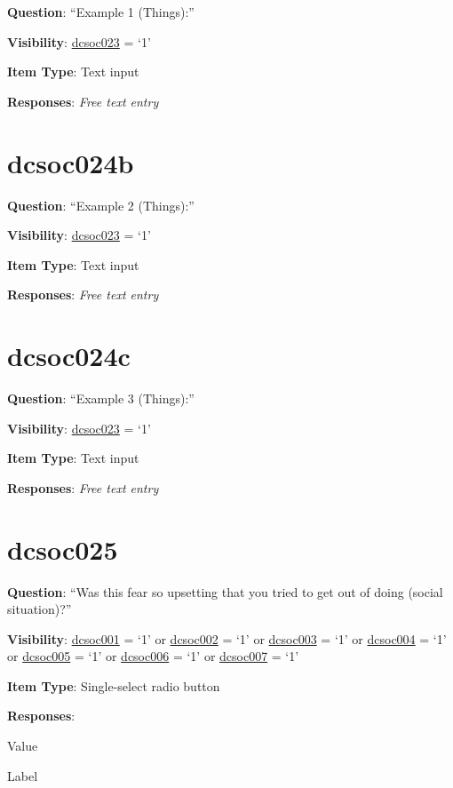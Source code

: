 \documentclass[]{book}
\begin{document}
\textbf{Question}: ``Example 1 (Things):''

\textbf{Visibility}: \protect\hyperlink{dcsoc023}{dcsoc023} = `1'

\textbf{Item Type}: Text input

\textbf{Responses}: \emph{Free text entry}

\hypertarget{dcsoc024b}{%
\section{dcsoc024b}\label{dcsoc024b}}

\textbf{Question}: ``Example 2 (Things):''

\textbf{Visibility}: \protect\hyperlink{dcsoc023}{dcsoc023} = `1'

\textbf{Item Type}: Text input

\textbf{Responses}: \emph{Free text entry}

\hypertarget{dcsoc024c}{%
\section{dcsoc024c}\label{dcsoc024c}}

\textbf{Question}: ``Example 3 (Things):''

\textbf{Visibility}: \protect\hyperlink{dcsoc023}{dcsoc023} = `1'

\textbf{Item Type}: Text input

\textbf{Responses}: \emph{Free text entry}

\hypertarget{dcsoc025}{%
\section{dcsoc025}\label{dcsoc025}}

\textbf{Question}: ``Was this fear so upsetting that you tried to get out of doing (social situation)?''

\textbf{Visibility}: \protect\hyperlink{dcsoc001}{dcsoc001} = `1' or \protect\hyperlink{dcsoc002}{dcsoc002} = `1' or \protect\hyperlink{dcsoc003}{dcsoc003} = `1' or \protect\hyperlink{dcsoc004}{dcsoc004} = `1' or \protect\hyperlink{dcsoc005}{dcsoc005} = `1' or \protect\hyperlink{dcsoc006}{dcsoc006} = `1' or \protect\hyperlink{dcsoc007}{dcsoc007} = `1'

\textbf{Item Type}: Single-select radio button

\textbf{Responses}:

Value

Label
\end{document}
